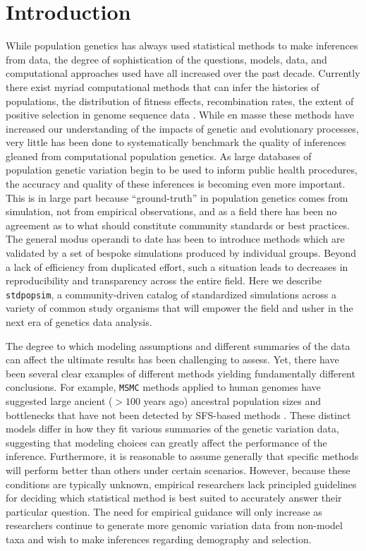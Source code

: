 \documentclass[12pt,halfline,a4paper]{ouparticle}
\newcommand{\stdpopsim}{\texttt{stdpopsim}\xspace}
\newcommand{\MSMC}{\texttt{MSMC}\xspace}
\begin{document}
\section*{Introduction}
While population genetics has always used statistical methods to make inferences from data,
the degree of sophistication of the questions, models, data, and computational approaches
used have all increased over the past decade. Currently there exist myriad computational methods
that can infer the histories of populations, the distribution of fitness effects,
recombination rates, the extent of positive selection in genome sequence data
\citep{li2011inference,schiffels2014inferring,terhorst2017robust,eyre2009estimating,kim2017inference,
chan2012genome,lin2013fast,Adrion662247,alachiotis2012omegaplus,degiorgio2016sweepfinder2,
kern2018diplos,sugden2018localization}.
While en masse these methods have increased our understanding of the
impacts of genetic and evolutionary processes, very little has been done to systematically
benchmark the quality of inferences gleaned from computational population genetics.
As large databases of population genetic variation begin to be used to inform public health procedures,
the accuracy and quality of these inferences is becoming even more important.
This is in large part because ``ground-truth'' in population genetics comes from simulation,
not from empirical observations, and as a field there has been no agreement as to what should
constitute community standards or best practices. The general modus operandi to date has been to
introduce methods which are validated by a set of bespoke simulations produced by individual
groups. Beyond a lack of efficiency from duplicated effort, such a situation leads
to decreases in reproducibility and transparency across the entire field.
Here we describe \stdpopsim, a community-driven catalog
of standardized simulations across a variety of common study organisms
that will empower the field and usher in the next era of genetics data analysis.

The degree to which modeling assumptions and different summaries of the
data can affect the ultimate results has been challenging to assess. Yet, there
have been several clear examples of different methods yielding fundamentally
different conclusions. For example, \MSMC methods applied to human genomes have
suggested large ancient ($>100$ years ago) ancestral population sizes and
bottlenecks that have not been detected by SFS-based methods
\citep[see][]{beichman2017comparison}.
These distinct models differ in how they fit various summaries of the
genetic variation data, suggesting that modeling choices can greatly affect the
performance of the inference. Furthermore, it is reasonable
to assume generally that specific methods will perform better than others under certain scenarios.
However, because these conditions are typically unknown, empirical researchers
lack principled guidelines for deciding which statistical method is best suited
to accurately answer their particular question. The need for empirical
guidance will only increase as researchers continue to generate more genomic
variation data from non-model taxa and wish to make inferences regarding
demography and selection.
\end{document}
